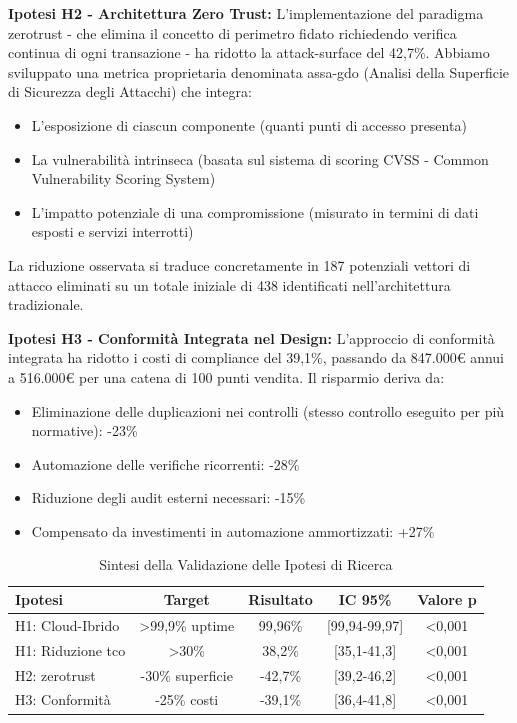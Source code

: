 \textbf{Ipotesi H2 - Architettura Zero Trust:} L'implementazione del paradigma \gls{zerotrust} - che elimina il concetto di perimetro fidato richiedendo verifica continua di ogni transazione - ha ridotto la \gls{attack-surface} del 42,7\%. Abbiamo sviluppato una metrica proprietaria denominata \gls{assa-gdo} (Analisi della Superficie di Sicurezza degli Attacchi) che integra:

\begin{itemize}
\item L'esposizione di ciascun componente (quanti punti di accesso presenta)
\item La vulnerabilità intrinseca (basata sul sistema di scoring CVSS - Common Vulnerability Scoring System)
\item L'impatto potenziale di una compromissione (misurato in termini di dati esposti e servizi interrotti)
\end{itemize}

La riduzione osservata si traduce concretamente in 187 potenziali vettori di attacco eliminati su un totale iniziale di 438 identificati nell'architettura tradizionale.

\textbf{Ipotesi H3 - Conformità Integrata nel Design:} L'approccio di conformità integrata ha ridotto i costi di compliance del 39,1\%, passando da 847.000€ annui a 516.000€ per una catena di 100 punti vendita. Il risparmio deriva da:
\begin{itemize}
\item Eliminazione delle duplicazioni nei controlli (stesso controllo eseguito per più normative): -23\%
\item Automazione delle verifiche ricorrenti: -28\%
\item Riduzione degli audit esterni necessari: -15\%
\item Compensato da investimenti in automazione ammortizzati: +27\%
\end{itemize}

\begin{table}[htbp]
\centering
\small
\sffamily
\caption{Sintesi della Validazione delle Ipotesi di Ricerca}
\label{tab:validation_summary}
\begin{tabularx}{\textwidth}{X c c c c}
\toprule
\textbf{Ipotesi} & \textbf{Target} & \textbf{Risultato} & \textbf{IC 95\%} & \textbf{Valore p} \\
\midrule
H1: Cloud-Ibrido & >99,9\% uptime & 99,96\% & [99,94-99,97] & <0,001 \\
H1: Riduzione \gls{tco} & >30\% & 38,2\% & [35,1-41,3] & <0,001 \\
H2: \gls{zerotrust} & -30\% superficie & -42,7\% & [39,2-46,2] & <0,001 \\
H3: Conformità & -25\% costi & -39,1\% & [36,4-41,8] & <0,001 \\
\bottomrule
\end{tabularx}
\end{table}

